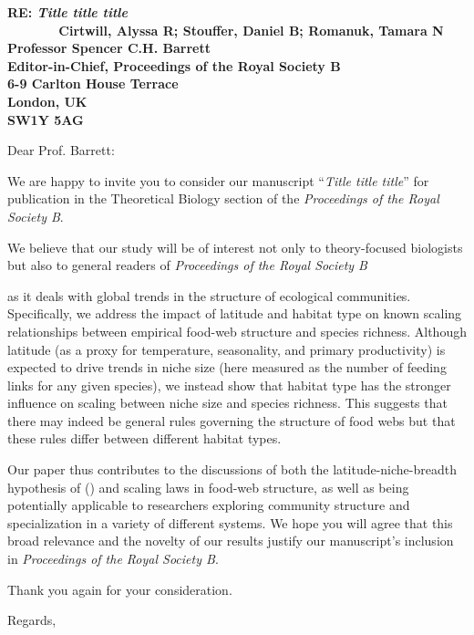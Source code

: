 \documentclass[12pt]{letter}
\newcommand{\mytitle}{\emph{Title title title}}
\newcommand{\myjournal}{\emph{Proceedings of the Royal Society B}}
\begin{document}
\begin{letter}{{\bf RE: \mytitle\\
               ~~~~~~~Cirtwill, Alyssa R; Stouffer, Daniel B; Romanuk, Tamara N\\
               \vspace*{20pt}
               Professor Spencer C.H. Barrett\\
               Editor-in-Chief, Proceedings of the Royal Society B\\
               6-9 Carlton House Terrace\\
               London, UK\\
               SW1Y 5AG\\
                }

\opening{Dear Prof. Barrett:}

We are happy to invite you to consider our manuscript 
``\mytitle'' for publication in the Theoretical Biology section of the \emph{\myjournal}. 


We believe that our study will be of interest not only to theory-focused biologists but also to general readers
of \emph{\myjournal}} as it deals with global trends in the structure of ecological communities. 
Specifically, we address the impact of latitude and habitat type on known scaling relationships between empirical
food-web structure and species richness. Although latitude (as a proxy for temperature, seasonality, and primary 
productivity) is expected to drive trends in niche size (here measured as the number of feeding links for any 
given species), we instead show that habitat type has the stronger influence on scaling between niche size and 
species richness. This suggests that there may indeed be general rules governing the structure of food webs but 
that these rules differ between different habitat types.


Our paper thus contributes to the discussions of both the latitude-niche-breadth hypothesis of () and scaling
laws in food-web structure, as well as being potentially applicable to researchers exploring community 
structure and specialization in a variety of different systems. We hope you will agree that this broad relevance
and the novelty of our results justify our manuscript's inclusion in \emph{\myjournal}.

Thank you again for your consideration.

\closing{Regards,}


\end{letter}


\end{document}
